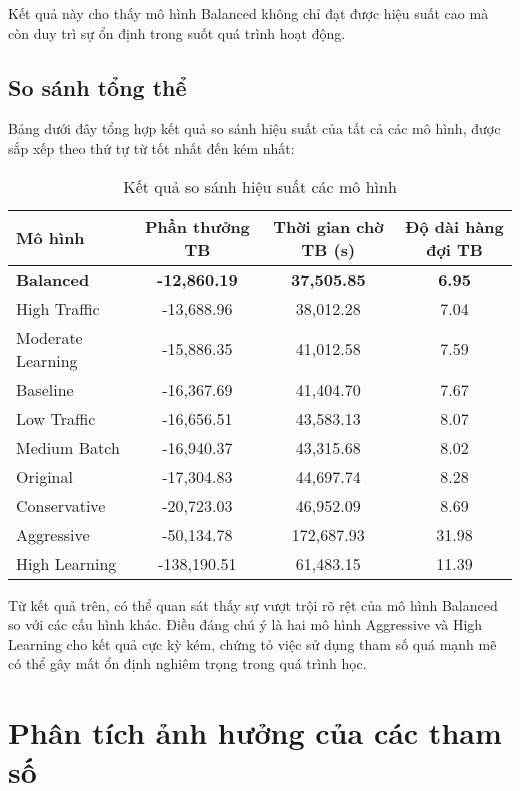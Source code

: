 Kết quả này cho thấy mô hình Balanced không chỉ đạt được hiệu suất cao mà còn duy trì sự ổn định trong suốt quá trình hoạt động.

\subsection{So sánh tổng thể}

Bảng dưới đây tổng hợp kết quả so sánh hiệu suất của tất cả các mô hình, được sắp xếp theo thứ tự từ tốt nhất đến kém nhất:

\begin{table}[H]
\centering
\caption{Kết quả so sánh hiệu suất các mô hình}
\label{tab:model_performance_comparison}
\begin{tabular}{@{}lccc@{}}
\toprule
\textbf{Mô hình} & \textbf{Phần thưởng TB} & \textbf{Thời gian chờ TB (s)} & \textbf{Độ dài hàng đợi TB} \\
\midrule
\textbf{Balanced} & \textbf{-12,860.19} & \textbf{37,505.85} & \textbf{6.95} \\
High Traffic & -13,688.96 & 38,012.28 & 7.04 \\
Moderate Learning & -15,886.35 & 41,012.58 & 7.59 \\
Baseline & -16,367.69 & 41,404.70 & 7.67 \\
Low Traffic & -16,656.51 & 43,583.13 & 8.07 \\
Medium Batch & -16,940.37 & 43,315.68 & 8.02 \\
Original & -17,304.83 & 44,697.74 & 8.28 \\
Conservative & -20,723.03 & 46,952.09 & 8.69 \\
Aggressive & -50,134.78 & 172,687.93 & 31.98 \\
High Learning & -138,190.51 & 61,483.15 & 11.39 \\
\bottomrule
\end{tabular}
\end{table}

Từ kết quả trên, có thể quan sát thấy sự vượt trội rõ rệt của mô hình Balanced so với các cấu hình khác. Điều đáng chú ý là hai mô hình Aggressive và High Learning cho kết quả cực kỳ kém, chứng tỏ việc sử dụng tham số quá mạnh mẽ có thể gây mất ổn định nghiêm trọng trong quá trình học.

\section{Phân tích ảnh hưởng của các tham số}

